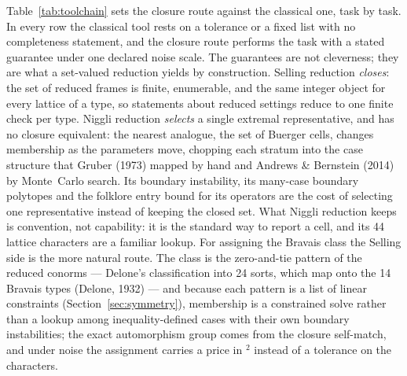 \documentclass[preprint,pdf]{iucr}          %
\newcommand{\Ang}{\text{\AA}}
\begin{document}
Table~\ref{tab:toolchain} sets the closure route against the classical one, task by task. In every row the classical tool rests on a tolerance or a fixed list with no completeness statement, and the closure route performs the task with a stated guarantee under one declared noise scale. The guarantees are not cleverness; they are what a set-valued reduction yields by construction. Selling reduction \emph{closes}: the set of reduced frames is finite, enumerable, and the same integer object for every lattice of a type, so statements about reduced settings reduce to one finite check per type. Niggli reduction \emph{selects} a single extremal representative, and has no closure equivalent: the nearest analogue, the set of Buerger cells, changes membership as the parameters move, chopping each stratum into the case structure that Gruber (1973) mapped by hand and Andrews \& Bernstein (2014) by Monte~Carlo search. Its boundary instability, its many-case boundary polytopes and the folklore entry bound for its operators are the cost of selecting one representative instead of keeping the closed set. What Niggli reduction keeps is convention, not capability: it is the standard way to report a cell, and its 44 lattice characters are a familiar lookup. For assigning the Bravais class the Selling side is the more natural route. The class is the zero-and-tie pattern of the reduced conorms --- Delone's classification into 24 sorts, which map onto the 14 Bravais types (Delone, 1932) --- and because each pattern is a list of linear constraints (Section~\ref{sec:symmetry}), membership is a constrained solve rather than a lookup among inequality-defined cases with their own boundary instabilities; the exact automorphism group comes from the closure self-match, and under noise the assignment carries a price in \Ang$^2$ instead of a tolerance on the characters.
\end{document}

